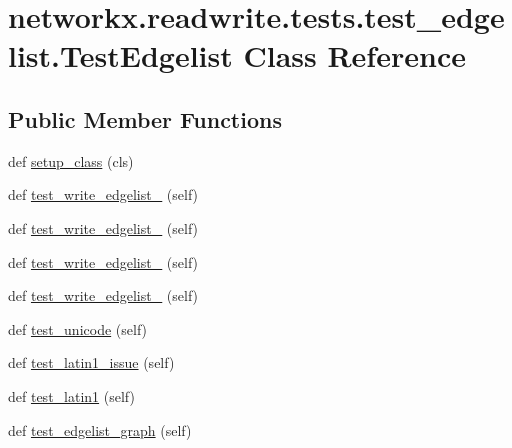 \hypertarget{classnetworkx_1_1readwrite_1_1tests_1_1test__edgelist_1_1TestEdgelist}{}\section{networkx.\+readwrite.\+tests.\+test\+\_\+edgelist.\+Test\+Edgelist Class Reference}
\label{classnetworkx_1_1readwrite_1_1tests_1_1test__edgelist_1_1TestEdgelist}
\subsection*{Public Member Functions}
\begin{DoxyCompactItemize}
\item 
def \hyperlink{classnetworkx_1_1readwrite_1_1tests_1_1test__edgelist_1_1TestEdgelist_a50d20017db601b8d93ed3372e9848e97}{setup\+\_\+class} (cls)
\item 
def \hyperlink{classnetworkx_1_1readwrite_1_1tests_1_1test__edgelist_1_1TestEdgelist_a83fd3428e6096d0eebcb97ead711cc69}{test\+\_\+write\+\_\+edgelist\+\_} (self)
\item 
def \hyperlink{classnetworkx_1_1readwrite_1_1tests_1_1test__edgelist_1_1TestEdgelist_a8c0087416e6b89afb0fa9c32272568ef}{test\+\_\+write\+\_\+edgelist\+\_} (self)
\item 
def \hyperlink{classnetworkx_1_1readwrite_1_1tests_1_1test__edgelist_1_1TestEdgelist_af53a0cb34673ad6d77d3584b5baac514}{test\+\_\+write\+\_\+edgelist\+\_} (self)
\item 
def \hyperlink{classnetworkx_1_1readwrite_1_1tests_1_1test__edgelist_1_1TestEdgelist_ade93418c6883f78c1c30362ccbd2d3f1}{test\+\_\+write\+\_\+edgelist\+\_} (self)
\item 
def \hyperlink{classnetworkx_1_1readwrite_1_1tests_1_1test__edgelist_1_1TestEdgelist_a6492827a5eba2b0df464d97f1f72e6d9}{test\+\_\+unicode} (self)
\item 
def \hyperlink{classnetworkx_1_1readwrite_1_1tests_1_1test__edgelist_1_1TestEdgelist_aa3a552f281ad12e1d432f5756289e96e}{test\+\_\+latin1\+\_\+issue} (self)
\item 
def \hyperlink{classnetworkx_1_1readwrite_1_1tests_1_1test__edgelist_1_1TestEdgelist_a3f2de84196c855bb743b135f146d22d1}{test\+\_\+latin1} (self)
\item 
def \hyperlink{classnetworkx_1_1readwrite_1_1tests_1_1test__edgelist_1_1TestEdgelist_a86dc98c67e0db026c4e6a01d91cb28d1}{test\+\_\+edgelist\+\_\+graph} (self)

\end{DoxyCompactItemize}
